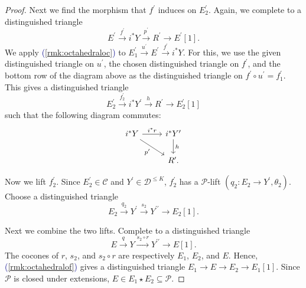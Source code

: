 \documentclass[11pt]{amsart}
\def\eqref#1{\textcolor{darkblue}{(\ref{#1})}}
\theoremstyle{plain}
\theoremstyle{definition}
\numberwithin{equation}{section}
\numberwithin{theorem}{section}
\begin{document}
\begin{proof}
    Next we find the morphism that $f^\prime$ induces on $E^\prime_2$.
    Again, we complete to a distinguished triangle
    \begin{displaymath}
        E^\prime\xrightarrow{f^\prime} i^\ast Y\xrightarrow{p^\prime} R^\prime\to E^\prime[1].
    \end{displaymath}
    We apply \eqref{rmk:octahedraloc} to $E^\prime_1\xrightarrow{u^\prime} E^\prime\xrightarrow{f^\prime} i^\ast Y$.
    For this, we use the given distinguished triangle on $u^\prime$, the chosen distinguished triangle on $f^\prime$, and the bottom row of the diagram above as the distinguished triangle on $f^\prime\circ u^\prime = f^\prime_1$.
    This gives a distinguished triangle
    \begin{displaymath}
        E^\prime_2\xrightarrow{f^\prime_2} i^\ast Y^\prime\xrightarrow{h} R^\prime\to E^\prime_2[1]
    \end{displaymath}
    such that the following diagram commutes:
    \begin{displaymath}
        \begin{tikzcd}
            i^\ast Y \ar[r, "i^\ast r"] \ar[dr, "p^\prime"'] & i^\ast Y^\prime \ar[d, "h"] \\
            & R^\prime.
        \end{tikzcd}
    \end{displaymath}

    Now we lift $f^\prime_2$.
    Since $E^\prime_2\in \mathcal{C}$ and $Y^\prime\in \mathcal{D}^{\leq K}$, $f^\prime_2$ has a $\mathcal{P}$-lift $(q_2\colon E_2\to Y^\prime,\theta_2)$.
    Choose a distinguished triangle
    \begin{displaymath}
        E_2\xrightarrow{q_2} Y^\prime\xrightarrow{s_2} Y^{\prime\prime}\to E_2[1].
    \end{displaymath}

    Next we combine the two lifts.
    Complete to a distinguished triangle
    \begin{displaymath}
        E\xrightarrow{q} Y\xrightarrow{s_2\circ r} Y^{\prime\prime}\to E[1].
    \end{displaymath}
    The cocones of $r$, $s_2$, and $s_2\circ r$ are respectively $E_1$, $E_2$, and $E$.
    Hence, \eqref{rmk:octahedralof} gives a distinguished triangle $E_1\to E\to E_2\to E_1[1]$.
    Since $\mathcal{P}$ is closed under extensions, $E\in E_1\star E_2\subseteq \mathcal{P}$.


\end{proof}
\end{document}
